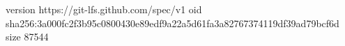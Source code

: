 version https://git-lfs.github.com/spec/v1
oid sha256:3a000fc2f3b95c0800430e89edf9a22a5d61fa3a82767374119df39ad79bcf6d
size 87544
